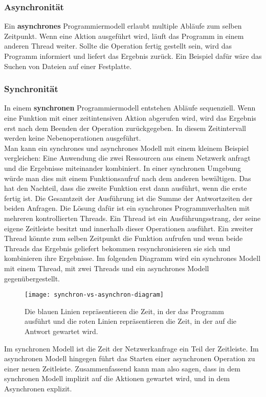 \subsubsection{Asynchronität}

Ein \textbf{asynchrones} Programmiermodell erlaubt multiple Abläufe zum selben Zeitpunkt. Wenn eine Aktion ausgeführt wird, läuft das Programm in einem anderen \glqq Thread\grqq{} weiter. Sollte die Operation fertig gestellt sein, wird das Programm informiert und liefert das Ergebnis zurück. Ein Beispiel dafür wäre das Suchen von Dateien auf einer Festplatte\cite{asynchronitaet}.

\subsubsection{Synchronität}

In einem \textbf{synchronen} Programmiermodell entstehen Abläufe sequenziell. Wenn eine Funktion mit einer zeitintensiven Aktion abgerufen wird, wird das Ergebnis erst nach dem Beenden der Operation zurückgegeben. In diesem Zeitintervall werden keine Nebenoperationen ausgeführt\cite{asynchronitaet}.\\

\noindent
Man kann ein synchrones und asynchrones Modell mit einem kleinem Beispiel vergleichen: Eine Anwendung die zwei Ressourcen aus einem Netzwerk anfragt und die Ergebnisse miteinander kombiniert. In einer synchronen Umgebung würde man dies mit einem Funktionsaufruf nach dem anderen bewältigen. Das hat den Nachteil, dass die zweite Funktion erst dann ausführt, wenn die erste fertig ist. Die Gesamtzeit der Ausführung ist die Summe der Antwortzeiten der beiden Anfragen. Die Lösung dafür ist ein synchrones Programmverhalten mit mehreren kontrollierten Threads. Ein Thread ist ein Ausführungsstrang, der seine eigene Zeitleiste besitzt und innerhalb dieser Operationen ausführt. Ein zweiter Thread könnte zum selben Zeitpunkt die Funktion aufrufen und wenn beide Threads das Ergebnis geliefert bekommen resynchronisieren sie sich und kombinieren ihre Ergebnisse\cite{asynchronitaet}. Im folgenden Diagramm wird ein synchrones Modell mit einem Thread, mit zwei Threads und ein asynchrones Modell gegenübergestellt.

\begin{center}
\begin{figure}[H]
\texttt{[image: synchron-vs-asynchron-diagram]}
\caption{Die blauen Linien repräsentieren die Zeit, in der das Programm ausführt und die roten Linien repräsentieren die Zeit, in der auf die Antwort gewartet wird.}
\end{figure}
\end{center}

\noindent
Im synchronen Modell ist die Zeit der Netzwerkanfrage ein Teil der Zeitleiste. Im asynchronen Modell hingegen führt das Starten einer asynchronen Operation zu einer neuen Zeitleiste. Zusammenfassend kann man also sagen, dass in dem synchronen Modell implizit auf die Aktionen gewartet wird, und in dem Asynchronen explizit.